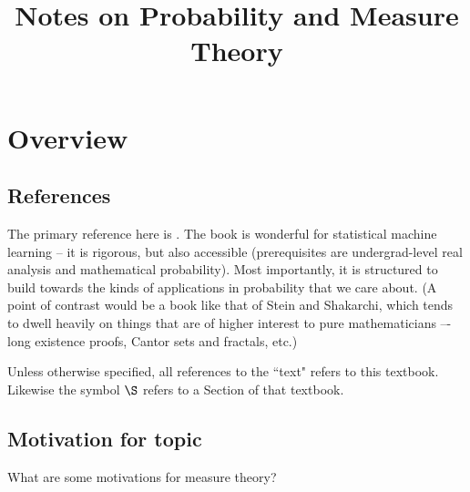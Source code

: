 \documentclass{article} %
\begin{document}
\title{Notes on Probability and Measure Theory} 
\maketitle
\setcounter{tocdepth}{2}
\tableofcontents
\newpage 

\section{Overview}

\subsection{References}
The primary reference here is \cite{ash2000probability}.   The book is wonderful for statistical machine learning – it is rigorous,  but also accessible (prerequisites are undergrad-level real analysis and mathematical probability).  Most importantly, it is structured to build towards the kinds of applications in probability that we care about.   (A point of contrast would be a book like that of Stein and Shakarchi, which tends to dwell heavily on things that are of higher interest to pure mathematicians –- long existence proofs, Cantor sets and fractals, etc.) 

 Unless otherwise specified, all references to the ``text" refers to this textbook.  Likewise the symbol $\S$ refers to a Section of that textbook.
 
\subsection{Motivation for topic} \label{sec:motivation_for_topic}

What are some motivations for measure theory?
\end{document}
